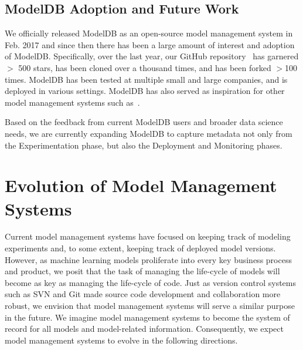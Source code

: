 \documentclass[11pt]{article}
\newcommand{\mdb}{{\sc ModelDB}\xspace}
\begin{document}


\subsection{\mdb Adoption and Future Work}

We officially released \mdb as an open-source model management system in 
Feb. 2017 and since then there has been a large amount of interest and adoption of \mdb.
Specifically, over the last year, our GitHub repository~\cite{mdb-repo} 
has garnered $>$ 500 stars, has been cloned over a thousand times, and has been
forked $>$100 times.
\mdb has been tested at multiple small and large companies, and is deployed in
various settings.
\mdb has also served as inspiration for other model management systems such as~\cite{mlflow}.

Based on the feedback from current \mdb users and broader data science needs, we are currently expanding \mdb to capture metadata not only from the Experimentation phase, but also the Deployment and Monitoring phases.

\section{Evolution of Model Management Systems}
\label{sec:future}

Current model management systems have focused on keeping track of modeling experiments and, to some extent, keeping track of deployed model versions. 
However, as machine learning models proliferate into every key business process and product, we posit that the task of managing the life-cycle of models will become as key as managing the life-cycle of code.
Just as version control systems such as SVN and Git made source code development and collaboration more robust, we envision that model management systems will serve a similar purpose in the future.
We imagine model management systems to become the system of record for all models and model-related information. 
Consequently, we expect model management systems to evolve in the following directions.
\end{document}
